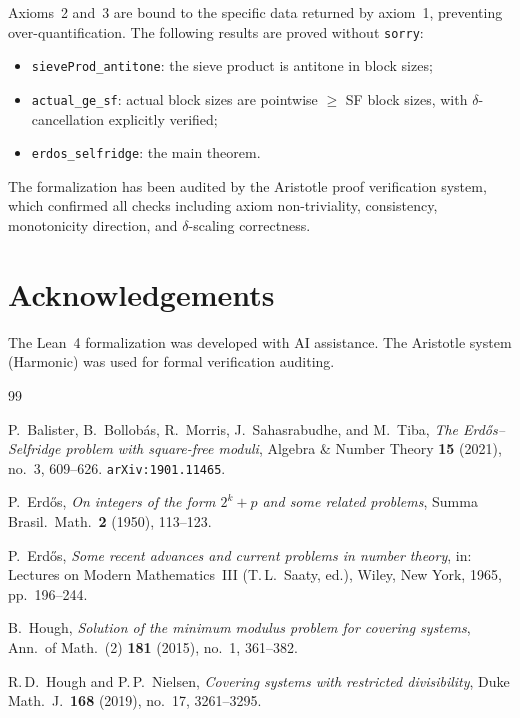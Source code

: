 \documentclass[11pt]{amsart}
\theoremstyle{definition}
\theoremstyle{remark}
\begin{document}
Axioms~2 and~3 are bound to the specific data returned by axiom~1, preventing
over-quantification.
The following results are proved without \texttt{sorry}:

\begin{itemize}
\item \texttt{sieveProd\_antitone}: the sieve product is antitone in block sizes;
\item \texttt{actual\_ge\_sf}: actual block sizes are pointwise $\geq$ SF block sizes,
      with $\delta$-cancellation explicitly verified;
\item \texttt{erdos\_selfridge}: the main theorem.
\end{itemize}

The formalization has been audited by the Aristotle proof verification system,
which confirmed all checks including axiom non-triviality, consistency, monotonicity
direction, and $\delta$-scaling correctness.

\section*{Acknowledgements}

The Lean~4 formalization was developed with AI assistance.
The Aristotle system (Harmonic) was used for formal verification auditing.

\begin{thebibliography}{99}

P.~Balister, B.~Bollob\'as, R.~Morris, J.~Sahasrabudhe, and M.~Tiba,
\emph{The Erd\H{o}s--Selfridge problem with square-free moduli},
Algebra \& Number Theory \textbf{15} (2021), no.~3, 609--626.
\texttt{arXiv:1901.11465}.

P.~Erd\H{o}s,
\emph{On integers of the form $2^k + p$ and some related problems},
Summa Brasil.\ Math.\ \textbf{2} (1950), 113--123.

P.~Erd\H{o}s,
\emph{Some recent advances and current problems in number theory},
in: Lectures on Modern Mathematics~III (T.\,L.~Saaty, ed.),
Wiley, New York, 1965, pp.~196--244.

B.~Hough,
\emph{Solution of the minimum modulus problem for covering systems},
Ann.\ of Math.\ (2) \textbf{181} (2015), no.~1, 361--382.

R.\,D.~Hough and P.\,P.~Nielsen,
\emph{Covering systems with restricted divisibility},
Duke Math.\ J.\ \textbf{168} (2019), no.~17, 3261--3295.

\end{thebibliography}
\end{document}
